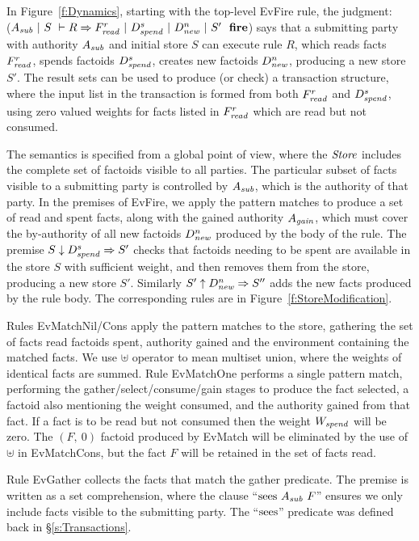 In Figure~\ref{f:Dynamics}, starting with the top-level EvFire rule, the judgment: \\
($A_{\mathit{sub}}~|~S~\vdash R \Rightarrow F^r_{\mathit{read}}~|~D^s_{\mathit{spend}}~|~D^n_{\mathit{new}}~|~S'~~\textbf{fire}$) says that a submitting party with authority $A_{\mathit{sub}}$ and initial store $S$ can execute rule $R$, which reads facts $F^r_{\mathit{read}}$, spends factoids $D^s_{\mathit{spend}}$, creates new factoids $D^n_{\mathit{new}}$, producing a new store $S'$. The result sets can be used to produce (or check) a transaction structure, where the input list in the transaction is formed from both $F^r_{\mathit{read}}$ and $D^s_{\mathit{spend}}$, using zero valued weights for facts listed in $F^r_{\mathit{read}}$ which are read but not consumed.

The semantics is specified from a global point of view, where the $\mathit{Store}$ includes the complete set of factoids visible to all parties. The particular subset of facts visible to a submitting party is controlled by $A_{\mathit{sub}}$, which is the authority of that party. In the premises of EvFire, we apply the pattern matches to produce a set of read and spent facts, along with the gained authority $A_{\mathit{gain}}$, which must cover the by-authority of all new factoids $D^n_{\mathit{new}}$ produced by the body of the rule. The premise $S \downarrow D^s_{\mathit{spend}} \Rightarrow S'$ checks that factoids needing to be spent are available in the store $S$ with sufficient weight, and then removes them from the store, producing a new store $S'$. Similarly $S' \uparrow D^n_{\mathit{new}} \Rightarrow S''$ adds the new facts produced by the rule body. The corresponding rules are in Figure~\ref{f:StoreModification}.

Rules EvMatchNil/Cons apply the pattern matches to the store, gathering the set of facts read factoids spent, authority gained and the environment containing the matched facts. We use $\uplus$ operator to mean multiset union, where the weights of identical facts are summed. Rule EvMatchOne performs a single pattern match, performing the gather/select/consume/gain stages to produce the fact selected, a factoid also mentioning the weight consumed, and the authority gained from that fact. If a fact is to be read but not consumed then the weight $W_{\mathit{spend}}$ will be zero. The $(F,~ 0)$ factoid produced by EvMatch will be eliminated by the use of $\uplus$ in EvMatchCons, but the fact $F$ will be retained in the set of facts read.

Rule EvGather collects the facts that match the gather predicate. The premise is written as a set comprehension, where the clause ``$\textrm{sees}~ A_{\mathit{sub}}~ F$'' ensures we only include facts visible to the submitting party. The ``$\textrm{sees}$'' predicate was defined back in \S\ref{s:Transactions}.

